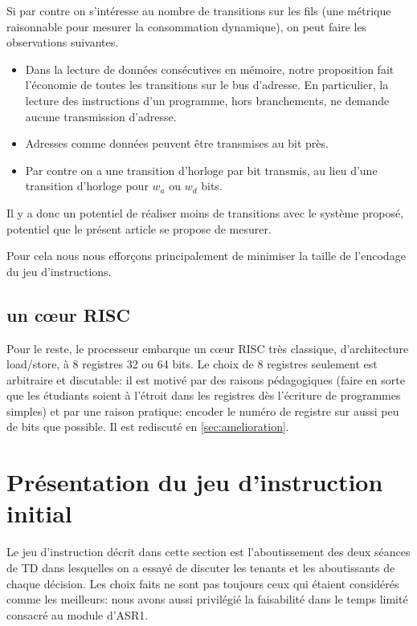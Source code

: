 \documentclass[architecture]{compas2018}
\newcommand{\todo}[1]{\textcolor{red}{TODO: #1}}
\begin{document}
Si par contre on s'intéresse au nombre de transitions sur les fils (une métrique raisonnable pour mesurer la consommation dynamique), on peut faire les observations suivantes.

\begin{itemize}
\item Dans la lecture de données consécutives en mémoire, notre proposition fait l'économie de toutes les transitions sur le bus d'adresse.
  En particulier, la lecture des instructions d'un programme, hors branchements,  ne demande aucune transmission d'adresse.
\item Adresses comme données peuvent être transmises au bit près.
\item Par contre on a une transition d'horloge par bit transmis, au lieu d'une transition d'horloge pour $w_a$ ou $w_d$ bits.
\end{itemize}
Il y a donc un potentiel de réaliser moins de transitions avec le système proposé, potentiel que le présent article se propose de mesurer.

Pour cela nous nous efforçons principalement de minimiser la taille de l'encodage du jeu d'instructions.

\subsection{un c\oe ur  RISC}
Pour le reste, le processeur embarque un c\oe ur RISC très classique, d'architecture load/store, à 8 registres 32 ou 64 bits.  
Le choix de 8 registres seulement est arbitraire et discutable: il est motivé par des raisons pédagogiques (faire en sorte que les étudiants soient à l'étroit dans les registres  dès l'écriture de programmes simples) et par une raison pratique: encoder le numéro de registre sur aussi peu de bits que possible.
Il est rediscuté en \ref{sec:amelioration}. 


\section{Présentation du jeu d'instruction initial}
Le jeu d'instruction décrit dans cette section est l'aboutissement des deux séances de TD dans lesquelles on a essayé de discuter les tenants et les aboutissants de chaque décision.
Les choix faits ne sont pas toujours ceux qui étaient considérés comme les meilleurs: nous avons aussi privilégié la faisabilité dans le temps limité consacré au module d'ASR1.
\end{document}
